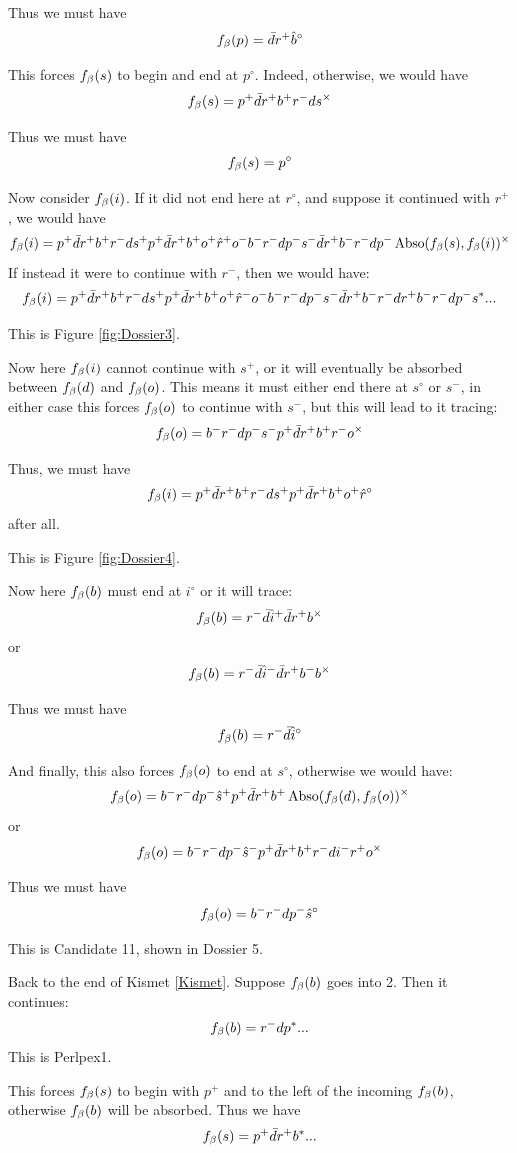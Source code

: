 Thus we must have
\[
f_\beta(p) = \bar{d} r^+ \hat{b}^\circ
\]

This forces $f_\beta(s)$ to begin and end at $p^\circ$. Indeed, otherwise, we would have
\[
f_\beta(s) = p^+ \bar{d} r^+ b^+ r^- d s^\times
\]

Thus we must have
\[
f_\beta(s) = p^\circ
\]

Now consider $f_\beta(i)$. If it did not end here at $r^\circ$, and suppose it continued with $r^+$, we would have
\[
f_\beta(i) = p^+ \bar{d} r^+ b^+ r^- d s^+ p^+ \bar{d} r^+ b^+ o^+ \hat{r}^+ o^- b^- r^- d p^- s^- \bar{d} r^+ b^- r^- d p^- \operatorname{Abso}(f_\beta(s), f_\beta(i))^\times
\]
If instead it were to continue with $r^-$, then we would have:
\[
f_\beta(i) = p^+ \bar{d} r^+ b^+ r^- d s^+ p^+ \bar{d} r^+ b^+ o^+ \hat{r}^- o^- b^- r^- d p^- s^- \bar{d} r^+ b^- r^- d r^+ b^- r^- d p^- s^*...
\]

This is Figure \ref{fig:Dossier3}.
 
Now here $f_\beta(i)$ cannot continue with $s^+$, or it will eventually be absorbed between $f_\beta(d)$ and $f_\beta(o)$. This means it must either end there at $s^\circ$ or $s^-$, in either case this forces $f_\beta(o)$ to continue with $s^-$, but this will lead to it tracing:
\[
f_\beta(o) = b^- r^- d p^- s^- p^+ \bar{d} r^+ b^+ r^- o^\times
\]

Thus, we must have
\[
f_\beta(i) = p^+ \bar{d} r^+ b^+ r^- d s^+ p^+ \bar{d} r^+ b^+ o^+ \hat{r}^\circ
\]
after all.

This is Figure \ref{fig:Dossier4}.

Now here $f_\beta(b)$ must end at $i^\circ$ or it will trace:
\[
f_\beta(b) = r^- \bar{d} \hat{i}^+ \bar{d} r^+ b^\times
\]
or
\[
f_\beta(b) = r^- \bar{d} \hat{i}^- \bar{d} r^+ b^- b^\times
\]

Thus we must have
\[
f_\beta(b) = r^- \bar{d} \hat{i}^\circ
\]

And finally, this also forces $f_\beta(o)$ to end at $s^\circ$, otherwise we would have:
\[
f_\beta(o) = b^- r^- d p^- \hat{s}^+ p^+ \bar{d} r^+ b^+ \operatorname{Abso}(f_\beta(d), f_\beta(o))^\times
\]
or
\[
f_\beta(o) = b^- r^- d p^- \hat{s}^- p^+ \bar{d} r^+ b^+ r^- d i^- r^+ o^\times
\]

Thus we must have
\[
f_\beta(o) = b^- r^- d p^- \hat{s}^\circ
\]


This is Candidate 11, shown in Dossier 5.

\label{Perplex}
Back to the end of Kismet \ref{Kismet}. Suppose $f_\beta(b)$ goes into 2. Then it continues:
\[
f_\beta(b) = r^- d p^*...
\]
This is Perlpex1.

This forces $f_\beta(s)$ to begin with $p^+$ and to the left of the incoming $f_\beta(b)$, otherwise $f_\beta(b)$ will be absorbed. Thus we have
\[
f_\beta(s) = p^+ \bar{d} r^+ b^*...
\]

